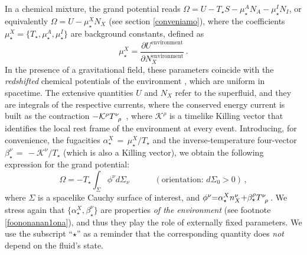 \documentclass[a4paper, amsfonts, amssymb, amsmath, reprint, showkeys, nofootinbib, twoside,notitlepage,onecolumn]{revtex4-2}
\newcommand{\spc}{\quad \quad \quad}
\theoremstyle{definition}
\theoremstyle{theorem}
\theoremstyle{corollary}
\begin{document}
In a chemical mixture, the grand potential reads $\Omega=U-T_\star S-\mu_\star^A N_A -
\mu_\star^I N_I$, or equivalently $\Omega =U-\mu_\star^X N_X$ (see section \ref{conveniamo}), where the coefficients $\mu_\star^X=\{T_\star,\mu_\star^A,\mu_\star^I\}$ are background constants, defined as
\begin{equation}
\mu_\star^X =\dfrac{\partial U^\text{environment}}{\partial N_X^{\text{environment}}} \, .
\end{equation}
In the presence of a gravitational field, these parameters coincide with the \textit{redshifted} chemical potentials of the environment \cite[\S 27]{landau5}, which are uniform in spacetime. The extensive quantities $U$ and $N_X$ refer to the superfluid, and they are integrals of the respective currents, where the conserved energy current is built as the contraction $-\mathcal{K}^\rho T\indices{^\nu _\rho}$ \cite[\S 3.8]{carroll_2019}, where $\mathcal{K}^\rho$ is a timelike Killing vector that identifies the local rest frame of the environment at every event. Introducing, for convenience, the fugacities $\alpha_\star^X\,{=}\,\mu_\star^X/T_\star$ and the inverse-temperature four-vector $\beta_\star^\nu\,{=}\,- \mathcal{K}^\nu/T_\star$ \cite{Israel_Stewart_1979,Israel_2009_inbook,BecattiniBeta2016} (which is also a Killing vector), we obtain the following expression for the grand potential:
\begin{equation}
\Omega=-T_\star \int_{\Sigma} \phi^\nu d\Sigma_\nu \spc (\text{orientation: } d\Sigma_0>0)\, ,
\end{equation}
where $\Sigma$ is a spacelike Cauchy surface of interest, and $\phi^\nu {=} \alpha_\star^X n^\nu_X {+}\beta_\star^\rho T\indices{^\nu _\rho} $. We stress again that $\{ \alpha_\star^X, \beta_\star^\nu\}$ are properties \textit{of the environment} (see footnote \ref{foononanan1ona}), and thus they play the role of externally fixed parameters. We use the subscript ``$\star$'' as a reminder that the corresponding quantity does \textit{not} depend on the fluid's state.

\newpage
\end{document}
